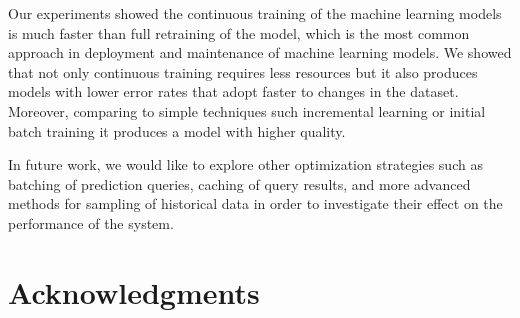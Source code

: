 \documentclass{sig-alternate-05-2015}
\begin{document}
Our experiments showed the continuous training of the machine learning models is much faster than full retraining of the model, which is the most common approach in deployment and maintenance of machine learning models. We showed that not only continuous training requires less resources but it also produces models with lower error rates that adopt faster to changes in the dataset.
Moreover, comparing to simple techniques such incremental learning or initial batch training it produces a model with higher quality.

In future work, we would like to explore other optimization strategies such as batching of prediction queries, caching of query results, and more advanced methods for sampling of historical data in order to investigate their effect on the performance of the system.
\section{Acknowledgments}


\end{document}
